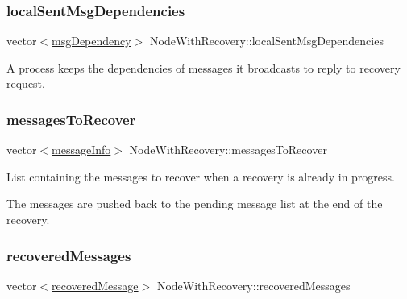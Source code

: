 \subsubsection{\texorpdfstring{local\+Sent\+Msg\+Dependencies}{localSentMsgDependencies}}
{\footnotesize\ttfamily vector$<$\hyperlink{_node_with_recovery_8h_a7a7c744666781dbc85c00bb4ccb4a60f}{msg\+Dependency}$>$ Node\+With\+Recovery\+::local\+Sent\+Msg\+Dependencies\hspace{0.3cm}{\ttfamily [protected]}}



A process keeps the dependencies of messages it broadcasts to reply to recovery request. 

\mbox{\label{class_node_with_recovery_a9ed4ac06c68ac579d7848a98b145b5ae}} 
\subsubsection{\texorpdfstring{messages\+To\+Recover}{messagesToRecover}}
{\footnotesize\ttfamily vector$<$\hyperlink{structures_8h_a7e7bdc1d2fff8a9436f2f352b2711ed6}{message\+Info}$>$ Node\+With\+Recovery\+::messages\+To\+Recover\hspace{0.3cm}{\ttfamily [protected]}}



List containing the messages to recover when a recovery is already in progress. 

The messages are pushed back to the pending message list at the end of the recovery. \mbox{\label{class_node_with_recovery_adf6b319a727cd9ec43a6cc68cbf99bbb}} 
\subsubsection{\texorpdfstring{recovered\+Messages}{recoveredMessages}}
{\footnotesize\ttfamily vector$<$\hyperlink{_node_with_recovery_8h_abc64f7ff8d329883ae93979292b1c996}{recovered\+Message}$>$ Node\+With\+Recovery\+::recovered\+Messages\hspace{0.3cm}{\ttfamily [protected]}}



